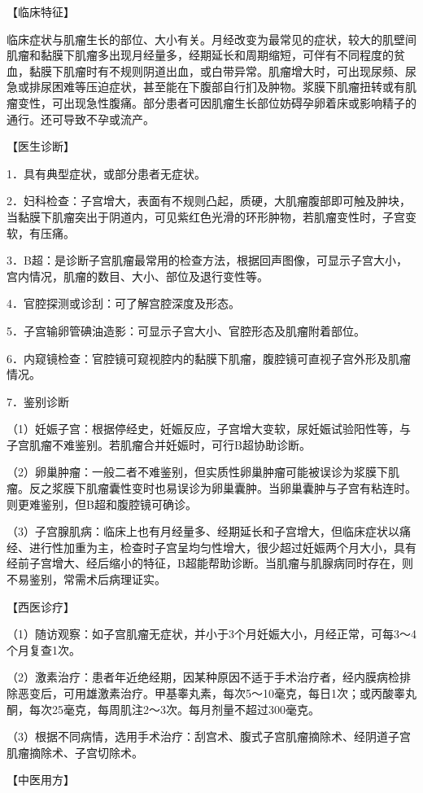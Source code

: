 \documentclass[12pt,UTF8]{ctexbook}
\begin{document}
【临床特征】

临床症状与肌瘤生长的部位、大小有关。月经改变为最常见的症状，较大的肌壁间肌瘤和黏膜下肌瘤多出现月经量多，经期延长和周期缩短，可伴有不同程度的贫血，黏膜下肌瘤时有不规则阴道出血，或白带异常。肌瘤增大时，可出现尿频、尿急或排尿困难等压迫症状，甚至能在下腹部自行扪及肿物。浆膜下肌瘤扭转或有肌瘤变性，可出现急性腹痛。部分患者可因肌瘤生长部位妨碍孕卵着床或影响精子的通行。还可导致不孕或流产。

【医生诊断】

1．具有典型症状，或部分患者无症状。

2．妇科检查：子宫增大，表面有不规则凸起，质硬，大肌瘤腹部即可触及肿块，当黏膜下肌瘤突出于阴道内，可见紫红色光滑的环形肿物，若肌瘤变性时，子宫变软，有压痛。

3．B超：是诊断子宫肌瘤最常用的检查方法，根据回声图像，可显示子宫大小，宫内情况，肌瘤的数目、大小、部位及退行变性等。

4．官腔探测或诊刮：可了解宫腔深度及形态。

5．子宫输卵管碘油造影：可显示子宫大小、官腔形态及肌瘤附着部位。

6．内窥镜检查：官腔镜可窥视腔内的黏膜下肌瘤，腹腔镜可直视子宫外形及肌瘤情况。

7．鉴别诊断

（1）妊娠子宫：根据停经史，妊娠反应，子宫增大变软，尿妊娠试验阳性等，与子宫肌瘤不难鉴别。若肌瘤合并妊娠时，可行B超协助诊断。

（2）卵巢肿瘤：一般二者不难鉴别，但实质性卵巢肿瘤可能被误诊为浆膜下肌瘤。反之浆膜下肌瘤囊性变时也易误诊为卵巢囊肿。当卵巢囊肿与子宫有粘连时。则更难鉴别，但B超和腹腔镜可确诊。

（3）子宫腺肌病：临床上也有月经量多、经期延长和子宫增大，但临床症状以痛经、进行性加重为主，检查时子宫呈均匀性增大，很少超过妊娠两个月大小，具有经前子宫增大、经后缩小的特征，B超能帮助诊断。当肌瘤与肌腺病同时存在，则不易鉴别，常需术后病理证实。

【西医诊疗】

（1）随访观察：如子宫肌瘤无症状，并小于3个月妊娠大小，月经正常，可每3～4个月复查1次。

（2）激素治疗：患者年近绝经期，因某种原因不适于手术治疗者，经内膜病检排除恶变后，可用雄激素治疗。甲基睾丸素，每次5～10毫克，每日1次；或丙酸睾丸酮，每次25毫克，每周肌注2～3次。每月剂量不超过300毫克。

（3）根据不同病情，选用手术治疗：刮宫术、腹式子宫肌瘤摘除术、经阴道子宫肌瘤摘除术、子宫切除术。

【中医用方】
\end{document}
